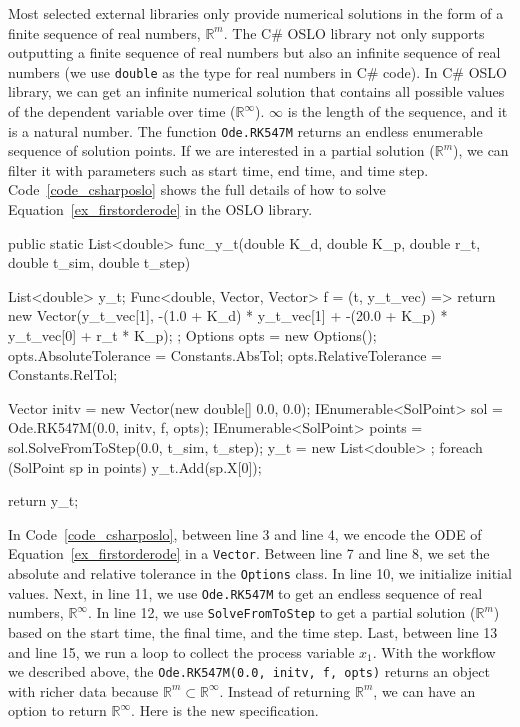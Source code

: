 Most selected external libraries only provide numerical solutions in the form of a finite sequence of real numbers, $\mathbb{R}^m$. The C\# OSLO library not only supports outputting a finite sequence of real numbers but also an infinite sequence of real numbers (we use \verb|double| as the type for real numbers in C\# code). In C\# OSLO library, we can get an infinite numerical solution that contains all possible values of the dependent variable over time ($\mathbb{R}^{\infty}$). $\infty$ is the length of the sequence, and it is a natural number. The function \verb|Ode.RK547M| returns an endless enumerable sequence of solution points. If we are interested in a partial solution ($\mathbb{R}^m$), we can filter it with parameters such as start time, end time, and time step. Code~\ref{code_csharposlo} shows the full details of how to solve Equation~\ref{ex_firstorderode} in the OSLO library.
\begin{listing}[ht]
\begin{csharp1}
public static List<double> func_y_t(double K_d, double K_p, double r_t, double t_sim, double t_step) {
    List<double> y_t;
    Func<double, Vector, Vector> f = (t, y_t_vec) => {
        return new Vector(y_t_vec[1], -(1.0 + K_d) * y_t_vec[1] + -(20.0 + K_p) * y_t_vec[0] + r_t * K_p);
    };
    Options opts = new Options();
    opts.AbsoluteTolerance = Constants.AbsTol;
    opts.RelativeTolerance = Constants.RelTol;
    
    Vector initv = new Vector(new double[] {0.0, 0.0});
    IEnumerable<SolPoint> sol = Ode.RK547M(0.0, initv, f, opts);
    IEnumerable<SolPoint> points = sol.SolveFromToStep(0.0, t_sim, t_step);
    y_t = new List<double> {};
    foreach (SolPoint sp in points) {
        y_t.Add(sp.X[0]);
    }
    
    return y_t;
}
\end{csharp1}
\label{code_csharposlo}
\end{listing}

In Code~\ref{code_csharposlo}, between line 3 and line 4, we encode the ODE of Equation~\ref{ex_firstorderode} in a \verb|Vector|. Between line 7 and line 8, we set the absolute and relative tolerance in the \verb|Options| class. In line 10, we initialize initial values. Next, in line 11, we use \verb|Ode.RK547M| to get an endless sequence of real numbers, $\mathbb{R}^{\infty}$. In line 12, we use \verb|SolveFromToStep| to get a partial solution ($\mathbb{R}^m$) based on the start time, the final time, and the time step. Last, between line 13 and line 15, we run a loop to collect the process variable $x_1$. With the workflow we described above, the \verb|Ode.RK547M(0.0, initv, f, opts)| returns an object with richer data because {}$\mathbb{R}^m \subset \mathbb{R}^{\infty}$. Instead of returning $\mathbb{R}^m$, we can have an option to return $\mathbb{R}^{\infty}$. Here is the new specification.

